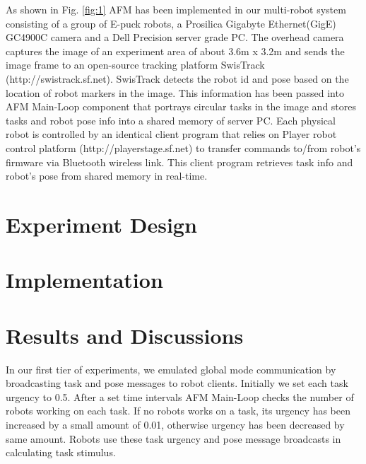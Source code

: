 \documentclass{llncs}
\begin{document}
As shown in Fig. \ref{fig:1} AFM has been implemented in our multi-robot system consisting of a group of E-puck robots, a Prosilica Gigabyte Ethernet(GigE) GC4900C camera and a Dell Precision server grade PC. The overhead camera captures the image of an experiment area of about 3.6m x 3.2m and sends the image frame to an open-source tracking platform SwisTrack (http://swistrack.sf.net). SwisTrack detects the robot id and pose based on the location of robot markers in the image. This information has been passed into AFM Main-Loop component that portrays circular tasks in the image and stores tasks and robot pose info into a shared memory of server PC. Each physical robot is controlled by an identical client program that relies on Player robot control platform (http://playerstage.sf.net) to transfer commands to/from robot's firmware via Bluetooth wireless link. This client program retrieves task info and robot's pose from shared memory in real-time.
% 
\section{Experiment Design}
\label{sec:expt-design}

\section{Implementation}
\label{sec:impl}

\section{Results and Discussions}
\label{sec:results}
In our first tier of experiments, we emulated global mode communication by broadcasting task and pose messages to robot clients. Initially we set each task urgency to 0.5. After a set time intervals AFM Main-Loop checks the number of robots working on each task. If no robots works on a task, its urgency has been increased by a small amount of 0.01, otherwise urgency has been decreased by same amount. Robots use these task urgency and pose message broadcasts in calculating task stimulus.
\end{document}
